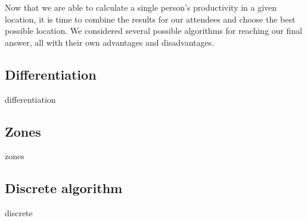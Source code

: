 
Now that we are able to calculate a single person's productivity in a given location, it is time to combine the results for our attendees and choose the best possible location. We considered several possible algorithms for reaching our final answer, all with their own advantages and disadvantages. 

\subsection{Differentiation}
{differentiation}

\subsection{Zones}
{zones}

\subsection{Discrete algorithm}
{discrete}